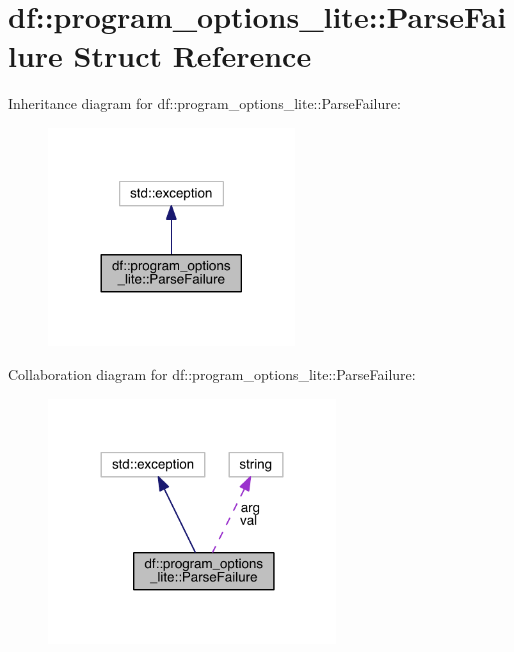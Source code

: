 \hypertarget{structdf_1_1program__options__lite_1_1_parse_failure}{}\section{df\+:\+:program\+\_\+options\+\_\+lite\+:\+:Parse\+Failure Struct Reference}
\label{structdf_1_1program__options__lite_1_1_parse_failure}


Inheritance diagram for df\+:\+:program\+\_\+options\+\_\+lite\+:\+:Parse\+Failure\+:
\nopagebreak
\begin{figure}[H]
\begin{center}
\leavevmode
\includegraphics[width=185pt]{db/d47/structdf_1_1program__options__lite_1_1_parse_failure__inherit__graph}
\end{center}
\end{figure}


Collaboration diagram for df\+:\+:program\+\_\+options\+\_\+lite\+:\+:Parse\+Failure\+:
\nopagebreak
\begin{figure}[H]
\begin{center}
\leavevmode
\includegraphics[width=216pt]{d2/d81/structdf_1_1program__options__lite_1_1_parse_failure__coll__graph}
\end{center}
\end{figure}

